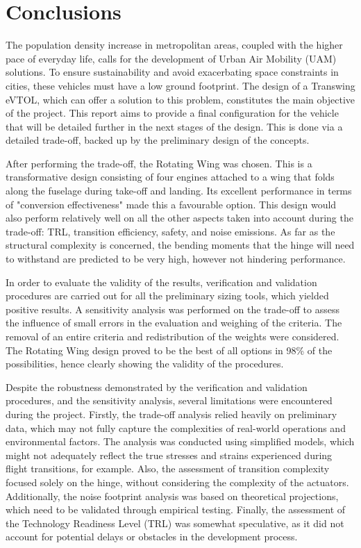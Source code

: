 \chapter{Conclusions}
\label{ch:conclusion}

The population density increase in metropolitan areas, coupled with the higher pace of everyday life, calls for the development of Urban Air Mobility (UAM) solutions. 
To ensure sustainability and avoid exacerbating space constraints in cities, these vehicles must have a low ground footprint. 
The design of a Transwing eVTOL, which can offer a solution to this problem, constitutes the main objective of the project. 
This report aims to provide a final configuration for the vehicle that will be detailed further in the next stages of the design. This is done via a detailed trade-off, backed up by the preliminary design of the concepts.

After performing the trade-off, the Rotating Wing was chosen. This is a transformative design consisting of four engines attached to a wing that folds along the fuselage during take-off and landing. 
Its excellent performance in terms of "conversion effectiveness" made this a favourable option. 
This design would also perform relatively well on all the other aspects taken into account during the trade-off: TRL, transition efficiency, safety, and noise emissions. 
As far as the structural complexity is concerned, the bending moments that the hinge will need to withstand are predicted to be very high, however not hindering performance.

In order to evaluate the validity of the results, verification and validation procedures are carried out for all the preliminary sizing tools, which yielded positive results. 
A sensitivity analysis was performed on the trade-off to assess the influence of small errors in the evaluation and weighing of the criteria. 
The removal of an entire criteria and redistribution of the weights were considered. 
The Rotating Wing design proved to be the best of all options in 98\% of the possibilities, hence clearly showing the validity of the procedures. 

Despite the robustness demonstrated by the verification and validation procedures, and the sensitivity analysis, several limitations were encountered during the project. Firstly, the trade-off analysis relied heavily on preliminary data, which may not fully capture the complexities of real-world operations and environmental factors. 
The analysis was conducted using simplified models, which might not adequately reflect the true stresses and strains experienced during flight transitions, for example. 
Also, the assessment of transition complexity focused solely on the hinge, without considering the complexity of the actuators.
Additionally, the noise footprint analysis was based on theoretical projections, which need to be validated through empirical testing.
Finally, the assessment of the Technology Readiness Level (TRL) was somewhat speculative, as it did not account for potential delays or obstacles in the development process.

